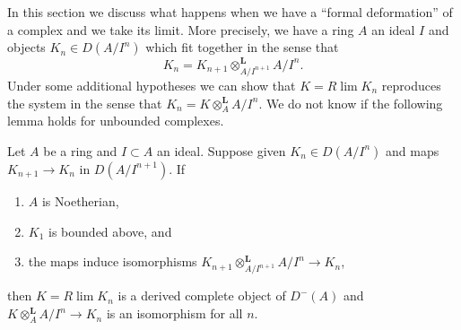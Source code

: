 \noindent
In this section we discuss what happens when we have a ``formal deformation''
of a complex and we take its limit. More precisely, we have a ring $A$
an ideal $I$ and objects $K_n \in D(A/I^n)$ which fit together 
in the sense that
$$
K_n = K_{n + 1} \otimes_{A/I^{n + 1}}^\mathbf{L} A/I^n.
$$
Under some additional hypotheses we can show that $K = R\lim K_n$ reproduces
the system in the sense that $K_n = K \otimes_A^\mathbf{L} A/I^n$.
We do not know if the following lemma holds for unbounded complexes.

\begin{lemma}
\label{lemma-Rlim-gives-complete}
Let $A$ be a ring and $I \subset A$ an ideal. Suppose
given $K_n \in D(A/I^n)$ and maps $K_{n + 1} \to K_n$ in
$D(A/I^{n + 1})$. If
\begin{enumerate}
\item $A$ is Noetherian,
\item $K_1$ is bounded above, and
\item the maps induce isomorphisms
$K_{n + 1} \otimes_{A/I^{n + 1}}^\mathbf{L} A/I^n \to K_n$,
\end{enumerate}
then $K = R\lim K_n$ is a derived complete object of $D^-(A)$ and
$K \otimes_A^\mathbf{L} A/I^n \to K_n$ is an isomorphism for all $n$.
\end{lemma}

